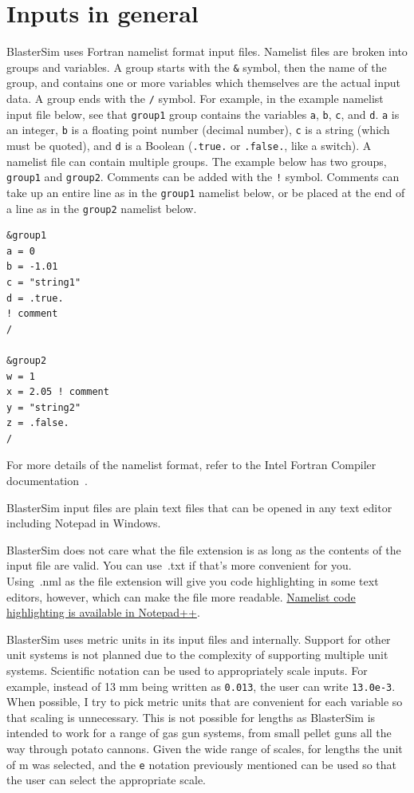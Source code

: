\section{Inputs in general}\label{inputs-general}

BlasterSim uses Fortran namelist format input files.
Namelist files are broken into groups and variables.
A group starts with the \texttt{\&} symbol, then the name of the group, and contains one or more variables which themselves are the actual input data.
A group ends with the \texttt{/} symbol.
For example, in the example namelist input file below, see that \texttt{group1} group contains the variables \texttt{a}, \texttt{b}, \texttt{c}, and \texttt{d}.
\texttt{a} is an integer, \texttt{b} is a floating point number (decimal number), \texttt{c} is a string (which must be quoted), and \texttt{d} is a Boolean (\texttt{.true.} or \texttt{.false.}, like a switch).
A namelist file can contain multiple groups.
The example below has two groups, \texttt{group1} and \texttt{group2}.
Comments can be added with the \texttt{!} symbol.
Comments can take up an entire line as in the \texttt{group1} namelist below, or be placed at the end of a line as in the \texttt{group2} namelist below.

\begin{lstlisting}
&group1
a = 0
b = -1.01
c = "string1"
d = .true.
! comment
/

&group2
w = 1
x = 2.05 ! comment
y = "string2"
z = .false.
/
\end{lstlisting}

For more details of the namelist format, refer to the Intel Fortran Compiler documentation~\cite{noauthor_namelist_2025}.

BlasterSim input files are plain text files that can be opened in any text editor including Notepad in Windows.

BlasterSim does not care what the file extension is as long as the contents of the input file are valid.
You can use~.txt if that's more convenient for you.
Using~.nml as the file extension will give you code highlighting in some text editors, however, which can make the file more readable.
\href{https://fortran-lang.discourse.group/t/namelist-syntax-highlighting-in-notepad/2451}{Namelist code highlighting is available in Notepad++}.

BlasterSim uses metric units in its input files and internally.
Support for other unit systems is not planned due to the complexity of supporting multiple unit systems.
Scientific notation can be used to appropriately scale inputs.
For example, instead of 13 mm being written as \texttt{0.013}, the user can write \texttt{13.0e-3}.
When possible, I try to pick metric units that are convenient for each variable so that scaling is unnecessary.
This is not possible for lengths as BlasterSim is intended to work for a range of gas gun systems, from small pellet guns all the way through potato cannons.
Given the wide range of scales, for lengths the unit of m was selected, and the \texttt{e} notation previously mentioned can be used so that the user can select the appropriate scale.

